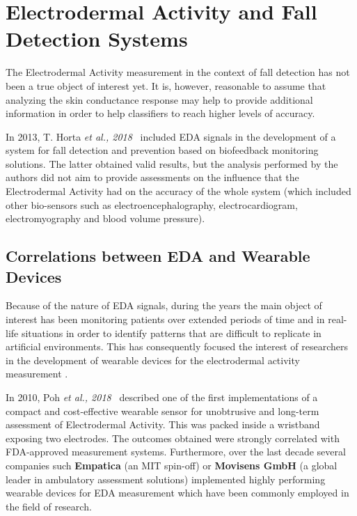 \section{Electrodermal Activity and Fall Detection Systems}\label{sec:eda-fall-detection}

The Electrodermal Activity measurement in the context of fall detection has not been a true object of interest yet. It is, however, reasonable to assume that analyzing the skin conductance response may help to provide additional information in order to help classifiers to reach higher levels of accuracy. 

In 2013, T. Horta \textit{et al., 2018}~\cite{eda-fall-detection} included EDA signals in the development of a system for fall detection and prevention based on biofeedback monitoring solutions. The latter obtained valid results, but the analysis performed by the authors did not aim to provide assessments on the influence that the Electrodermal Activity had on the accuracy of the whole system (which included other bio-sensors such as electroencephalography, electrocardiogram, electromyography and blood volume pressure).

\subsection{Correlations between EDA and Wearable Devices}\label{subsec:eda-wearables}

Because of the nature of EDA signals, during the years the main object of interest has been monitoring patients over extended periods of time and in real-life situations in order to identify patterns that are difficult to replicate in artificial environments. This has consequently focused the interest of researchers in the development of wearable devices for the electrodermal activity measurement \cite{poh-wearable}. 

In 2010, Poh \textit{et al., 2018}~\cite{poh-wearable} described one of the first implementations of a compact and cost-effective wearable sensor for unobtrusive and long-term assessment of Electrodermal Activity. This was packed inside a wristband exposing two electrodes. The outcomes obtained were strongly correlated with FDA-approved measurement systems. Furthermore, over the last decade several companies such \textbf{Empatica} (an MIT spin-off) or \textbf{Movisens GmbH} (a global leader in ambulatory assessment solutions) implemented highly performing wearable devices for EDA measurement which have been commonly employed in the field of research.

